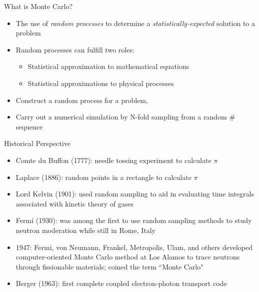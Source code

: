 \documentclass[xcolor=x11names,compress]{beamer}
\renewcommand{\(}{\begin{columns}}
\renewcommand{\)}{\end{columns}}
\newcommand{\<}[1]{\begin{column}{#1}}
\renewcommand{\>}{\end{column}}
\begin{document}


\begin{frame}{What is Monte Carlo?}

  \begin{itemize}
  \item The use of \textit{random processes} to determine a 
        \textit{statistically-expected} solution to a problem
  \vspace*{1em}
  \item Random processes can fulfill two roles:
  \begin{itemize}
    \item Statistical approximation to \alert{mathematical equations}
    \item Statistical approximations to \alert{physical processes}
  \end{itemize}   
 \vspace*{1em} 
  \item Construct a random process for a problem, 
  \item Carry out a numerical simulation by N-fold sampling from a random \# sequence
\end{itemize}
\end{frame}


\begin{frame}{Historical Perspective}

  \begin{itemize}
  \item Comte du Buffon (1777): needle tossing experiment to calculate $\pi$
  \pause
  \item Laplace (1886): random points in a rectangle to calculate $\pi$
    \pause
  \item Lord Kelvin (1901): used random sampling to aid in evaluating time integrals associated with kinetic theory of gases
    \pause
  \item Fermi (1930): was among the first to use random sampling methods to study neutron moderation while still in Rome, Italy
    \pause
  \item 1947: Fermi, von Neumann, Frankel, Metropolis, Ulam, and others developed computer-oriented Monte Carlo method at Los Alamos to trace neutrons through fissionable materials; coined the term ``Monte Carlo"
    \pause
  \item Berger (1963): first complete coupled electron-photon transport code 
\end{itemize}
\end{frame}
\end{document}
